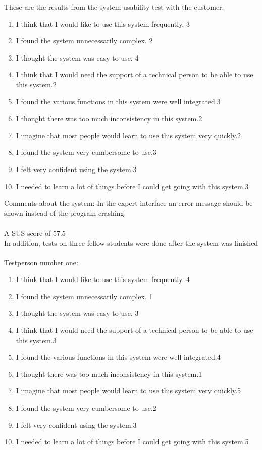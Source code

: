 These are the results from the system usability test with the customer:
\begin{enumerate} \setlength{\itemsep}{0cm}\setlength{\parskip}{0cm}
	\item I think that I would like to use this system frequently. \hfill 3 
	\item I found the system unnecessarily complex. \hfill 2
	\item I thought the system was easy to use. \hfill 4
	\item I think that I would need the support of a technical person to be able to use this system.\hfill 2
	\item I found the various functions in this system were well integrated.\hfill 3
	\item I thought there was too much inconsistency in this system.\hfill 2
	\item I imagine that most people would learn to use this system very quickly.\hfill 2
	\item I found the system very cumbersome to use.\hfill 3
	\item I felt very confident using the system.\hfill 3
	\item I needed to learn a lot of things before I could get going with this system.\hfill 3
\end{enumerate}
Comments about the system: In the expert interface an error message should be shown instead of the program crashing.\\ 
\\
A SUS score of 57.5\\

In addition, tests on three fellow students were done after the system was finished\\
\\
Testperson number one:
\begin{enumerate} \setlength{\itemsep}{0cm}\setlength{\parskip}{0cm}
	\item I think that I would like to use this system frequently. \hfill 4
	\item I found the system unnecessarily complex. \hfill 1
	\item I thought the system was easy to use. \hfill 3
	\item I think that I would need the support of a technical person to be able to use this system.\hfill 3
	\item I found the various functions in this system were well integrated.\hfill 4
	\item I thought there was too much inconsistency in this system.\hfill 1
	\item I imagine that most people would learn to use this system very quickly.\hfill 5
	\item I found the system very cumbersome to use.\hfill 2
	\item I felt very confident using the system.\hfill 3
	\item I needed to learn a lot of things before I could get going with this system.\hfill 5
\end{enumerate}

